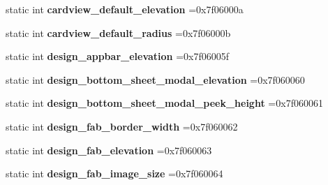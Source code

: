 \begin{DoxyCompactItemize}
static int {\bfseries cardview\+\_\+default\+\_\+elevation} =0x7f06000a
\item 
\mbox{\label{classandroid_1_1support_1_1v7_1_1cardview_1_1R_1_1dimen_a5e79b14b4aaf2c2d9c20f00c0a7f5d5e}} 
static int {\bfseries cardview\+\_\+default\+\_\+radius} =0x7f06000b
\item 
\mbox{\label{classandroid_1_1support_1_1v7_1_1cardview_1_1R_1_1dimen_a55330a17962f78b8b110d2f67858aea7}} 
static int {\bfseries design\+\_\+appbar\+\_\+elevation} =0x7f06005f
\item 
\mbox{\label{classandroid_1_1support_1_1v7_1_1cardview_1_1R_1_1dimen_a143fdfb95df628affa3a77c70732f040}} 
static int {\bfseries design\+\_\+bottom\+\_\+sheet\+\_\+modal\+\_\+elevation} =0x7f060060
\item 
\mbox{\label{classandroid_1_1support_1_1v7_1_1cardview_1_1R_1_1dimen_a838cebb5994b67b09ea3b430efdc0f12}} 
static int {\bfseries design\+\_\+bottom\+\_\+sheet\+\_\+modal\+\_\+peek\+\_\+height} =0x7f060061
\item 
\mbox{\label{classandroid_1_1support_1_1v7_1_1cardview_1_1R_1_1dimen_aef0eaace281148af3ce859166f5b9f05}} 
static int {\bfseries design\+\_\+fab\+\_\+border\+\_\+width} =0x7f060062
\item 
\mbox{\label{classandroid_1_1support_1_1v7_1_1cardview_1_1R_1_1dimen_aecfe0ed8b3aab6739060be5ae52278c4}} 
static int {\bfseries design\+\_\+fab\+\_\+elevation} =0x7f060063
\item 
\mbox{\label{classandroid_1_1support_1_1v7_1_1cardview_1_1R_1_1dimen_abae1528e605971ea49526e8c3cb01396}} 
static int {\bfseries design\+\_\+fab\+\_\+image\+\_\+size} =0x7f060064
\item 
\mbox{\label{classandroid_1_1support_1_1v7_1_1cardview_1_1R_1_1dimen_aeb3a823091c6d18dec4d9d0d4b53f66b}} 

\end{DoxyCompactItemize}
